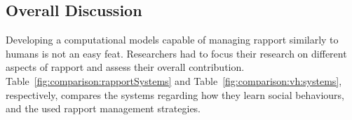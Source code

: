 
\subsection{Overall Discussion}
\label{subsec:RelWorkDiscussion}

Developing a computational models capable of managing rapport similarly to humans is not an easy feat. Researchers had to focus their research on different aspects of rapport and assess their overall contribution. Table~\ref{fig:comparison:rapportSystems} and Table~\ref{fig:comparison:vh:systems}, respectively, compares the systems regarding how they learn social behaviours, and the used rapport management strategies.

